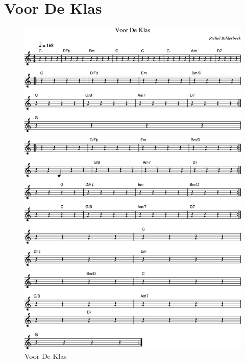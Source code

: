 \chapter{Voor De Klas}



\begin{figure}[!htbp]
  \includegraphics[width=\textwidth,height=\textheight,keepaspectratio]{../songs/53_voor_de_klas.png}
  \caption{Voor De Klas}
  \label{fig:53_voor_de_klas}
\end{figure}

